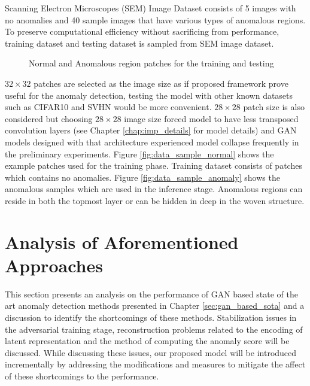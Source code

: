 Scanning Electron Microscopes (SEM) Image Dataset consists of 5 images with no anomalies and 40 sample images that have various types of
anomalous regions. To preserve computational efficiency without sacrificing from performance,
training dataset and testing dataset is sampled from SEM image dataset.
\begin{figure}[h!] 
	\hspace*{\fill} 
	\caption{Normal and Anomalous region patches for the training and testing}
	\label{fig:data_samples}
\end{figure}

$32 \times 32$ patches are selected as the image size as if proposed framework prove useful for the
anomaly detection, testing the model with other known datasets such as CIFAR10 \cite{cifar10} and
SVHN \cite{Netzer2011ReadingDI} would be more convenient. $28 \times 28$ patch size is also
considered but choosing $28 \times 28$ image size forced model to have less transposed convolution
layers (see Chapter \ref{chap:imp_details} for model details) and GAN models designed with that
architecture experienced model collapse frequently in the preliminary experiments. Figure
\ref{fig:data_sample_normal} shows the example patches used for the training phase. Training dataset
consists of patches which contains no anomalies. Figure \ref{fig:data_sample_anomaly} shows the
anomalous samples which are used in the inference stage. Anomalous regions can reside in both
the topmost layer or can be hidden in deep in the woven structure.


\section{Analysis of Aforementioned Approaches}
\label{sec:analysis_before}

This section presents an analysis on the performance of GAN based state of the art anomaly detection
methods presented in Chapter \ref{sec:gan_based_sota} and a discussion to identify the shortcomings
of these methods. Stabilization issues in the adversarial training stage, reconstruction problems
related to the encoding of latent representation and the method of computing the anomaly score will
be discussed. While discussing these issues, our proposed model will be introduced incrementally by
addressing the modifications and measures to mitigate the affect of these shortcomings to the
performance.

